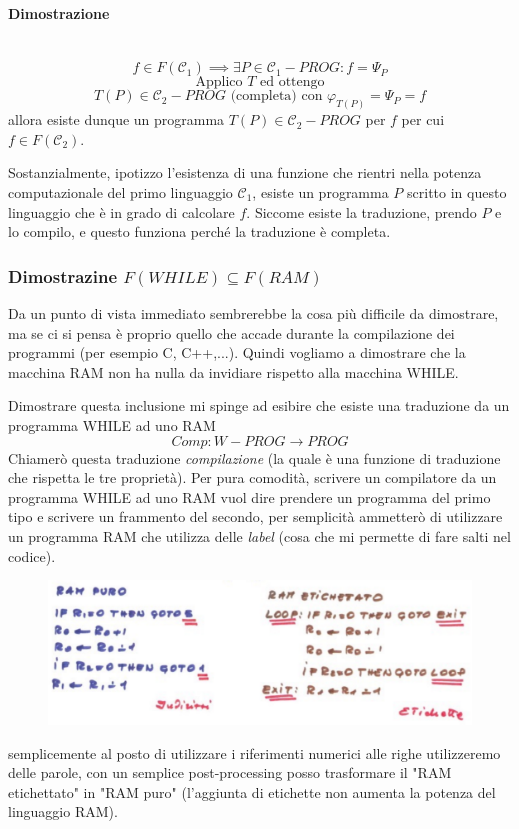 \documentclass{article}
\begin{document}
\paragraph{Dimostrazione}\mbox{}\\
$$f\in F(\mathcal{C}_1)\implies\exists P\in\mathcal{C}_1-PROG:f=\Psi_P$$
$$\text{Applico } T \text{ ed ottengo}$$
$$T(P)\in\mathcal{C}_2-PROG\text{ (completa) con }\varphi_{T(P)}=\Psi_P=f$$
allora esiste dunque un programma $T(P)\in\mathcal{C}_2-PROG$ per $f$ per cui
$f\in F(\mathcal{C}_2)$.

Sostanzialmente, ipotizzo l'esistenza di una funzione che rientri nella potenza computazionale
del primo linguaggio $\mathcal{C}_1$,
esiste un programma $P$ scritto in questo linguaggio che è in grado di calcolare $f$.
Siccome esiste la traduzione, prendo $P$ e lo compilo, e questo funziona perché la traduzione è completa.

\subsubsection{Dimostrazine $F(WHILE)\subseteq F(RAM)$}
Da un punto di vista immediato sembrerebbe la cosa più difficile da dimostrare, ma se ci si pensa
è proprio quello che accade durante la compilazione dei programmi (per esempio C, C++,...).
Quindi vogliamo a dimostrare che la macchina RAM non ha nulla da invidiare rispetto alla macchina WHILE.

Dimostrare questa inclusione mi spinge ad esibire che esiste una traduzione da un programma WHILE ad
uno RAM
$$Comp:W-PROG\rightarrow PROG$$
Chiamerò questa traduzione \textit{compilazione} (la quale è una funzione di traduzione che
rispetta le tre proprietà). Per pura comodità, scrivere un compilatore da un programma WHILE ad uno
RAM vuol dire prendere un programma del primo tipo e scrivere un frammento del secondo, per semplicità
ammetterò di utilizzare un programma RAM che utilizza delle \textit{label} (cosa che mi permette
di fare salti nel codice).
\begin{figure}[H]
    \centering
    \includegraphics[scale=0.4]{images/ram_etichettato.png}
\end{figure}
semplicemente al posto di utilizzare i riferimenti numerici alle righe utilizzeremo delle parole,
con un semplice post-processing posso trasformare il "RAM etichettato" in "RAM puro" (l'aggiunta
di etichette non aumenta la potenza del linguaggio RAM).
\end{document}
